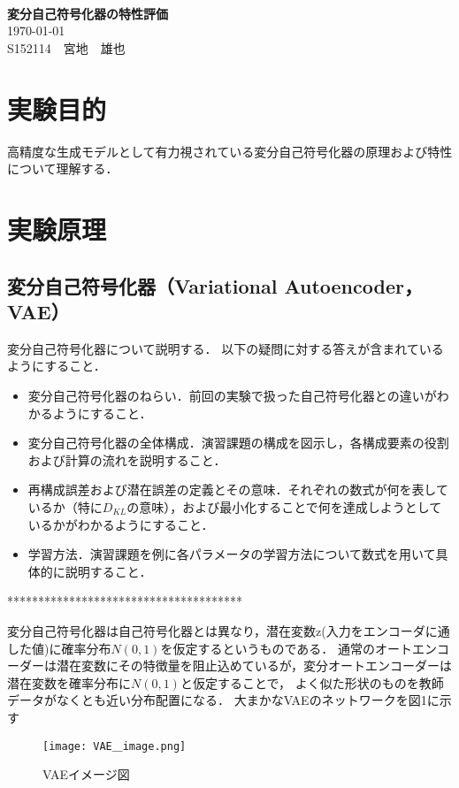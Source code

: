 \documentclass[12pt]{jsarticle}
\newcommand{\frontpage}[3]{%
\begin{center}
　\\
\vspace{15em}{\LARGE{}レポート課題}\\
　\\
{\Huge\bf#1}\\
\vspace{30em}
{\LARGE\today}\\
\vspace{2em}
{\LARGE#2　#3}
\end{center}
\thispagestyle{empty}
\clearpage
\setcounter{page}{1}
}
\begin{document}
\frontpage
{変分自己符号化器の特性評価}
{S152114}
{宮地　雄也}

\section{実験目的}

高精度な生成モデルとして有力視されている変分自己符号化器の原理および特性について理解する．

\section{実験原理}

\subsection{変分自己符号化器（Variational Autoencoder，VAE）}

変分自己符号化器について説明する．
以下の疑問に対する答えが含まれているようにすること．
\begin{itemize}
\item 変分自己符号化器のねらい．前回の実験で扱った自己符号化器との違いがわかるようにすること．
\item 変分自己符号化器の全体構成．演習課題の構成を図示し，各構成要素の役割および計算の流れを説明すること．
\item 再構成誤差および潜在誤差の定義とその意味．それぞれの数式が何を表しているか（特に$D_{KL}$の意味），および最小化することで何を達成しようとしているかがわかるようにすること．
\item 学習方法．演習課題を例に各パラメータの学習方法について数式を用いて具体的に説明すること．
\end{itemize}



**************************************


変分自己符号化器は自己符号化器とは異なり，潜在変数z(入力をエンコーダに通した値)に確率分布$N(0,1)$を仮定するというものである．
通常のオートエンコーダーは潜在変数にその特徴量を阻止込めているが，変分オートエンコーダーは潜在変数を確率分布に$N(0,1)$と仮定することで，
よく似た形状のものを教師データがなくとも近い分布配置になる．
大まかなVAEのネットワークを図1に示す

\begin{figure}[ht]
  \begin{center}
    \texttt{[image: VAE＿image.png]}
    \caption{VAEイメージ図}
  \end{center}
\end{figure}
\end{document}
